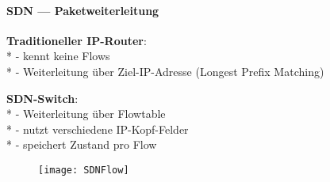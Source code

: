 \paragraph{SDN --- Paketweiterleitung}
\begin{items}
  \item \textbf{Traditioneller IP-Router}: \\*
    - kennt keine Flows \\*
    - Weiterleitung über Ziel-IP-Adresse (Longest Prefix Matching)
  \item \textbf{SDN-Switch}: \\*
    - Weiterleitung über Flowtable \\*
    - nutzt verschiedene IP-Kopf-Felder \\*
    - speichert Zustand pro Flow
\end{items}
\begin{figure}[H]\centering\label{SDNFlow}\texttt{[image: SDNFlow]}\end{figure}